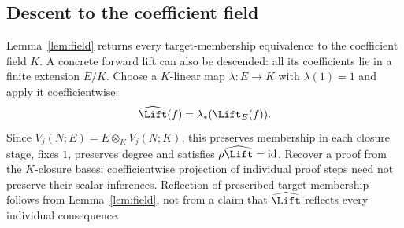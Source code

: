 \subsection{Descent to the coefficient field}\label{lift-sec:descent}
Lemma~\ref{lem:field} returns every target-membership equivalence to
the coefficient field $K$. A concrete forward lift can also be descended:
all its coefficients lie in a finite extension $E/K$. Choose a $K$-linear
map $\lambda:E\to K$ with $\lambda(1)=1$ and apply it coefficientwise:
\begin{equation}\label{lift-eq:fieldlift}
                  \widehat\Lift(f)=\lambda_*(\Lift_E(f)).
\end{equation}
Since $V_j(N;E)=E\otimes_K V_j(N;K)$, this preserves membership in each
closure stage, fixes $1$, preserves degree and satisfies
$\rho\widehat\Lift=\mathrm{id}$. Recover a proof from the $K$-closure
bases; coefficientwise projection of individual proof steps need not
preserve their scalar inferences. Reflection of prescribed target
membership follows from Lemma~\ref{lem:field}, not from a claim that
$\widehat\Lift$ reflects every individual consequence.

